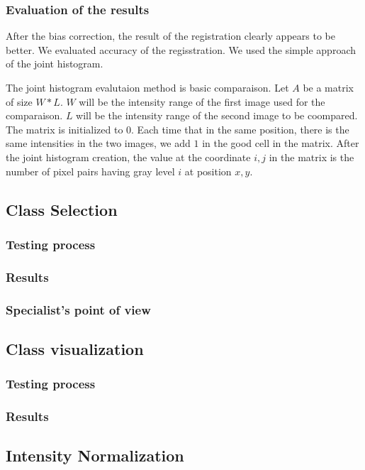 \subsubsection{Evaluation of the results}

After the bias correction, the result of the registration clearly appears to be better. We evaluated accuracy of the regisstration. We used the simple approach of the joint histogram.
\par
The joint histogram evalutaion method is basic comparaison. Let $A$ be a matrix of size $W*L$. $W$ will be the intensity range of the first image used for the comparaison. $L$ will be the intensity range of the second image to be coompared. The matrix is initialized to $0$. Each time that in the same position, there is the same intensities in the two images, we add $1$ in the good cell in the matrix.
After the joint histogram creation, the value at the coordinate ${i,j}$ in the matrix is the number of pixel pairs having gray level $i$ at position ${x,y}$.
%

%
\subsection{Class Selection}
%
\subsubsection{Testing process}
%
\subsubsection{Results}

%
\subsubsection{Specialist's point of view}
%

\subsection{Class visualization}
%
\subsubsection{Testing process}
%
\subsubsection{Results}
%
\subsection{Intensity Normalization}
%
